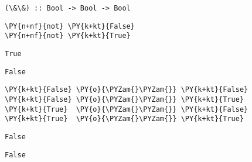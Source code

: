     
    
    \begin{Verbatim}[commandchars=\\\{\}]
(\&\&) :: Bool -> Bool -> Bool
    \end{Verbatim}

    
    \begin{tcolorbox}[breakable, size=fbox, boxrule=1pt, pad at break*=1mm,colback=cellbackground, colframe=cellborder, top=.75ex]
\begin{Verbatim}[commandchars=\\\{\}]
\PY{n+nf}{not} \PY{k+kt}{False}
\PY{n+nf}{not} \PY{k+kt}{True}
\end{Verbatim}
\end{tcolorbox}

    
    \begin{Verbatim}[commandchars=\\\{\}]
True
    \end{Verbatim}

    
    
    \begin{Verbatim}[commandchars=\\\{\}]
False
    \end{Verbatim}

    
    \begin{tcolorbox}[breakable, size=fbox, boxrule=1pt, pad at break*=1mm,colback=cellbackground, colframe=cellborder, top=.75ex]
\begin{Verbatim}[commandchars=\\\{\}]
\PY{k+kt}{False} \PY{o}{\PYZam{}\PYZam{}} \PY{k+kt}{False}
\PY{k+kt}{False} \PY{o}{\PYZam{}\PYZam{}} \PY{k+kt}{True}
\PY{k+kt}{True}  \PY{o}{\PYZam{}\PYZam{}} \PY{k+kt}{False}
\PY{k+kt}{True}  \PY{o}{\PYZam{}\PYZam{}} \PY{k+kt}{True}
\end{Verbatim}
\end{tcolorbox}

    
    \begin{Verbatim}[commandchars=\\\{\}]
False
    \end{Verbatim}

    
    
    \begin{Verbatim}[commandchars=\\\{\}]
False
    \end{Verbatim}

    
    
